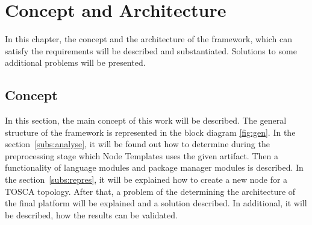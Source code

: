 
\chapter{Concept and Architecture}\label{chap:conarch}
In this chapter, the concept and the architecture of the framework, which can satisfy the requirements will be described and substantiated.
Solutions to some additional problems will be presented. 
\section{Concept}
In this section, the main concept of this work will be described.
The general structure of the framework is represented in the block diagram \ref{fig:gen}. 
In the section~\ref{subs:analyse}, it will be found out how to determine during the preprocessing stage which Node Templates uses the given artifact.
Then a functionality of language modules and package manager modules is described.
In the section~\ref{subs:repres}, it will be explained how to create a new node for a TOSCA topology. 
After that, a problem of the determining the architecture of the final platform will be explained and a solution described.
In additional, it will be described, how the results can be validated.



